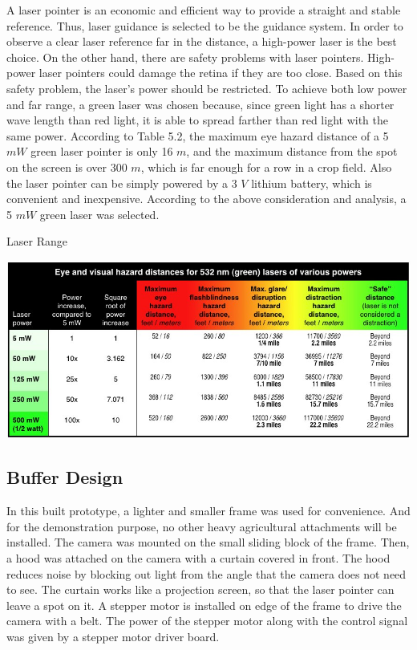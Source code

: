 A laser pointer is an economic and efficient way to provide a straight and stable reference. Thus, laser guidance is selected to be the guidance system. In order to observe a clear laser reference far in the distance, a high-power laser is the best choice. On the other hand, there are safety problems with laser pointers. High-power laser pointers could damage the retina if they are too close. Based on this safety problem, the laser's power should be restricted. To achieve both low power and far range, a green laser was chosen because, since green light has a shorter wave length than red light, it is able to spread farther than red light with the same power. According to Table 5.2, the maximum eye hazard distance of a 5 $mW$ green laser pointer is only 16 $m$, and the maximum distance from the spot on the screen is over 300 $m$, which is far enough for a row in a crop field. Also the laser pointer can be simply powered by a 3 $V$ lithium battery, which is convenient and inexpensive. According to the above consideration and analysis, a 5 $mW$ green laser was selected.
\begin{table}[ht!]
\begin{center}
\caption{Laser Range}
\includegraphics[scale = 0.5]{pics/laserrange.jpg}
\end{center}
\end{table}

\subsection{Buffer Design}


In this built prototype, a lighter and smaller frame was used for convenience. And for the demonstration purpose, no other heavy agricultural attachments will be installed. The camera was mounted on the small sliding block of the frame. Then, a hood was attached on the camera with a curtain covered in front. The hood reduces noise by blocking out light from the angle that the camera does not need to see. The curtain works like a projection screen, so that the laser pointer can leave a spot on it.  A stepper motor is installed on edge of the frame to drive the camera with a belt. The power of the stepper motor along with the control signal was given by a stepper motor driver board. 

